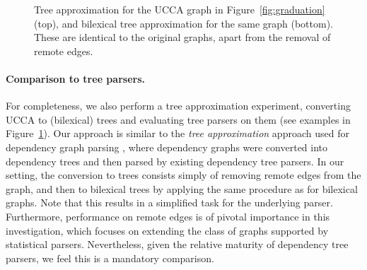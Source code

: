 \documentclass[11pt,a4paper]{article}
\newcommand{\figref}[1]{Figure~\ref{#1}}
\begin{document}
\begin{figure}
\centering
{}
  \caption{Tree approximation for the UCCA graph in \figref{fig:graduation} (top),
  and bilexical tree approximation for the same graph (bottom).
  These are identical to the original graphs,
  apart from the removal of remote edges.}
  \label{fig:tree_example}
\end{figure}

\paragraph{Comparison to tree parsers.}
For completeness,
we also perform a tree approximation experiment, converting UCCA to (bilexical) trees
and evaluating tree parsers on them (see examples in \figref{fig:tree_example}).
Our approach is similar
to the \textit{tree approximation} approach used for dependency graph parsing
\cite{agic2015semantic,fernandez2015parsing},
where dependency graphs were converted into dependency trees
and then parsed by existing dependency tree parsers.
In our setting, the conversion to trees consists simply of removing remote edges from the 
graph, and then to bilexical trees by applying the same procedure as for bilexical graphs.
Note that this results in a simplified task for the underlying parser.
Furthermore, performance on remote edges is of pivotal importance in this investigation,
which focuses on extending the class of graphs supported by statistical parsers.
Nevertheless, given the relative maturity of dependency tree parsers, we feel this is
a mandatory comparison.
\end{document}
